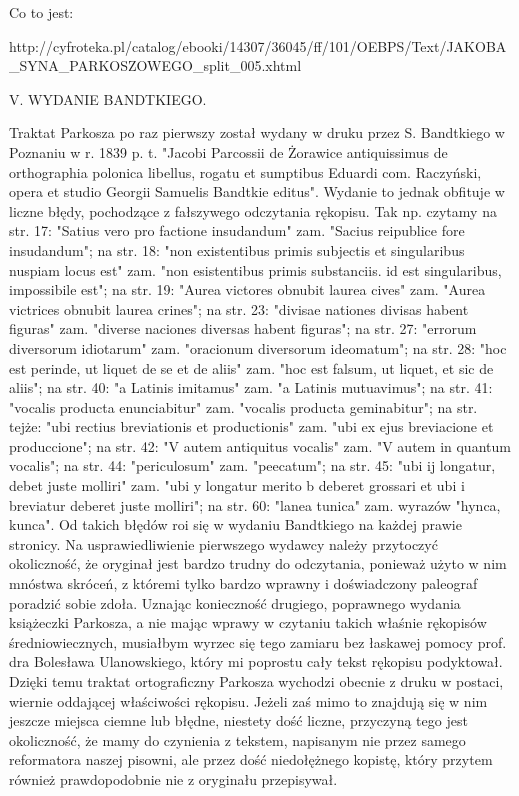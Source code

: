 \newcommand{\extra}[1]{\colorbox{magenta!10}{[#1]}}

\newcommand{\overstr}[1]{\annotatetextMagenta{⟦#1⟧}{przekreślenia}}

Co to jest:

http://cyfroteka.pl/catalog/ebooki/14307/36045/ff/101/OEBPS/Text/JAKOBA_SYNA_PARKOSZOWEGO_split_005.xhtml

V. WYDANIE BANDTKIEGO.

 

Traktat Parkosza po raz pierwszy został wydany w druku przez S. Bandtkiego w Poznaniu w r. 1839 p. t. "Jacobi Parcossii de Żorawice antiquissimus de orthographia polonica libellus, rogatu et sumptibus Eduardi com. Raczyński, opera et studio Georgii Samuelis Bandtkie editus". Wydanie to jednak obfituje w liczne błędy, pochodzące z fałszywego odczytania rękopisu. Tak np. czytamy na str. 17: "Satius vero pro factione insudandum" zam. "Sacius reipublice fore insudandum"; na str. 18: "non existentibus primis subjectis et singularibus nuspiam locus est" zam. "non esistentibus primis substanciis. id est singularibus, impossibile est"; na str. 19: "Aurea victores obnubit laurea cives" zam. "Aurea victrices obnubit laurea crines"; na str. 23: "divisae nationes divisas habent figuras" zam. "diverse naciones diversas habent figuras"; na str. 27: "errorum diversorum idiotarum" zam. "oracionum diversorum ideomatum"; na str. 28: "hoc est perinde, ut liquet de se et de aliis" zam. "hoc est falsum, ut liquet, et sic de aliis"; na str. 40: "a Latinis imitamus" zam. "a Latinis mutuavimus"; na str. 41: "vocalis producta enunciabitur" zam. "vocalis producta geminabitur"; na str. tejże: "ubi rectius breviationis et productionis" zam. "ubi ex ejus breviacione et produccione"; na str. 42: "V autem antiquitus vocalis" zam. "V autem in quantum vocalis"; na str. 44: "periculosum" zam. "peecatum"; na str. 45: "ubi ij longatur, debet juste molliri" zam. "ubi y longatur merito b deberet grossari et ubi i breviatur deberet juste molliri"; na str. 60: "lanea tunica" zam. wyrazów "hynca, kunca". Od takich błędów roi się w wydaniu Bandtkiego na każdej prawie stronicy. Na usprawiedliwienie pierwszego wydawcy należy przytoczyć okoliczność, że oryginał jest bardzo trudny do odczytania, ponieważ użyto w nim mnóstwa skróceń, z któremi tylko bardzo wprawny i doświadczony paleograf poradzić sobie zdoła. Uznając konieczność drugiego, poprawnego wydania książeczki Parkosza, a nie mając wprawy w czytaniu takich właśnie rękopisów średniowiecznych, musiałbym wyrzec się tego zamiaru bez łaskawej pomocy prof. dra Bolesława Ulanowskiego, który mi poprostu cały tekst rękopisu podyktował. Dzięki temu traktat ortograficzny Parkosza wychodzi obecnie z druku w postaci, wiernie oddającej właściwości rękopisu. Jeżeli zaś mimo to znajdują się w nim jeszcze miejsca ciemne lub błędne, niestety dość liczne, przyczyną tego jest okoliczność, że mamy do czynienia z tekstem, napisanym nie przez samego reformatora naszej pisowni, ale przez dość niedołężnego kopistę, który przytem również prawdopodobnie nie z oryginału przepisywał. 